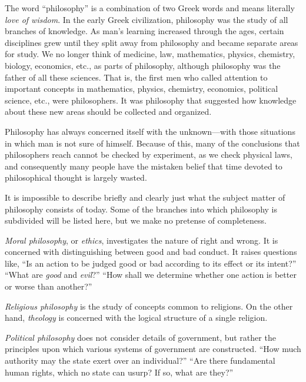 \documentclass[11pt]{book}
\theoremstyle{bkplain}
\theoremstyle{XIplainnote}
\theoremstyle{bkplain}
\theoremstyle{bkplain}
\begin{document}
The word ``philosophy'' is a combination of two Greek words and means
literally \emph{love of wisdom}. In the early Greek civilization, philosophy
was the study of all branches of knowledge. As man's learning increased
through the ages, certain disciplines grew until they split away from
philosophy and became separate areas for study. We no longer think of
medicine, law, mathematics, physics, chemistry, biology, economics, etc., as
parts of philosophy, although philosophy was the father of all these sciences.
That is, the first men who called attention to important concepts in
mathematics, physics, chemistry, economics, political science, etc., were
philosophers. It was philosophy that suggested how knowledge about these new
areas should be collected and organized.

Philosophy has always concerned itself with the unknown---with those
situations in which man is not sure of himself. Because of this, many of the
conclusions that philosophers reach cannot be checked by experiment, as we
check physical laws, and consequently many people have the mistaken belief
that time devoted to philosophical thought is largely wasted.

It is impossible to describe briefly and clearly just what the subject matter
of philosophy consists of today. Some of the branches into which philosophy is
subdivided will be listed here, but we make no pretense of completeness.

\emph{Moral philosophy}, or \emph{ethics}, investigates the nature of right
and wrong. It is concerned with distinguishing between good and bad conduct.
It raises questions like, ``Is an action to be judged good or bad according to
its effect or its intent?'' ``What are \emph{good} and \emph{evil}?'' ``How
shall we determine whether one action is better or worse than another?''

\emph{Religious philosophy} is the study of concepts common to religions. On
the other hand, \emph{theology} is concerned with the logical structure of a
single religion.

\emph{Political philosophy} does not consider details of government, but
rather the principles upon which various systems of government are
constructed. ``How much authority may the state exert over an individual?''
``Are there fundamental human rights, which no state can usurp? If so, what
are they?''
\end{document}
